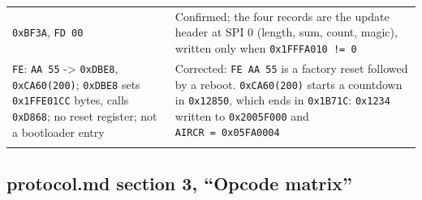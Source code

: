{\begin{longtable}[]{@{}
  >{\raggedright\arraybackslash}p{}
  >{\raggedright\arraybackslash}p{}@{}}
\texttt{0xBF3A}, \texttt{FD\ 00} & Confirmed; the four records are the
update header at SPI 0 (length, sum, count, magic), written only when
\texttt{0x1FFFA010\ !=\ 0} \\
\texttt{FE}: \texttt{AA\ 55} -\textgreater{} \texttt{0xDBE8},
\texttt{0xCA60(200)}; \texttt{0xDBE8} sets \texttt{0x1FFE01CC} bytes,
calls \texttt{0xD868}; no reset register; not a bootloader entry &
Corrected: \texttt{FE\ AA\ 55} is a factory reset followed by a reboot.
\texttt{0xCA60(200)} starts a countdown in \texttt{0x12850}, which ends
in \texttt{0x1B71C}: \texttt{0x1234} written to \texttt{0x2005F000} and
\texttt{AIRCR\ =\ 0x05FA0004} \\*
\end{longtable}
}

\subsection{protocol.md section 3, ``Opcode
matrix''}\label{protocol.md-section-3-opcode-matrix}

